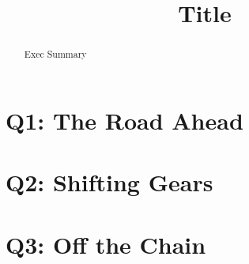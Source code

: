 \documentclass{mcm}
\title{Title}
\numberwithin{figure}{section}
\numberwithin{table}{section}
\numberwithin{equation}{section}
\begin{document}
    \begin{abstract}
        Exec Summary
    \end{abstract}

    \maketitle
    \tableofcontents
    \newpage


    \section{Q1: The Road Ahead}
    

    \section{Q2: Shifting Gears}
    

    \section{Q3: Off the Chain}
    
\end{document}
